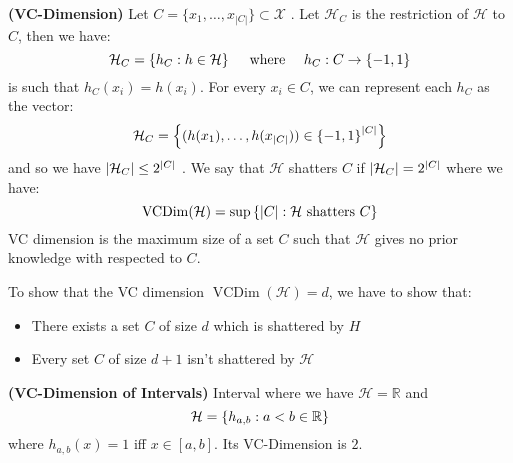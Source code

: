 \begin{definition}{\textbf{(VC-Dimension)}}
    Let $C = \{x_1,\dots,x_{|C|}\} \subset \mathcal{X}$ . Let $\mathcal{H}_C$ is the restriction of $\mathcal{H}$ to $C$, then we have:
    \begin{equation*}
        \mathcal{H}_C = \left\{ h_C : h\in\mathcal{H} \right\} \quad \text{ where } \quad h_C : C\rightarrow\left\{ -1, 1 \right\}
    \end{equation*}
    is such that $h_C(x_i) = h(x_i)$. For every $x_i \in C$, we can represent each $h_C$ as the vector:
    \begin{equation*}
        \mathcal{H}_C = \left\{ (h(x_1),\dots,h(x_{|C|}))\in\left\{ -1, 1 \right\}^{|C|} \right\}
    \end{equation*}
    and so we have $\left| \mathcal{H}_C \right|\le 2^{|C|}$ . We say that $\mathcal{H}$ shatters $C$ if $\left| \mathcal{H}_C \right| = 2^{|C|}$ where we have:
    \begin{equation*}
        \operatorname{VCDim}(\mathcal{H}) = \sup\left\{ |C| : \mathcal{H} \text{ shatters } C \right\}
    \end{equation*}
    VC dimension is the maximum size of a set $C$ such that $\mathcal{H}$ gives no prior knowledge with respected to $C$. 
\end{definition}

\begin{remark}
    To show that the VC dimension $\operatorname{VCDim}(\mathcal{H}) = d$, we have to show that:
    \begin{itemize}
        \item There exists a set $C$ of size $d$ which is shattered by $H$
        \item Every set $C$ of size $d+1$ isn't shattered by $\mathcal{H}$
    \end{itemize}
\end{remark}

\begin{proposition}{\textbf{(VC-Dimension of Intervals)}}
    Interval where we have $\mathcal{H} = \mathbb{R}$ and 
    \begin{equation*}
        \mathcal{H} = \left\{ h_{a, b} : a < b \in \mathbb{R} \right\}
    \end{equation*} 
    where $h_{a, b}(x) = 1$ iff $x \in [a, b]$. Its VC-Dimension is $2$. 
\end{proposition}

